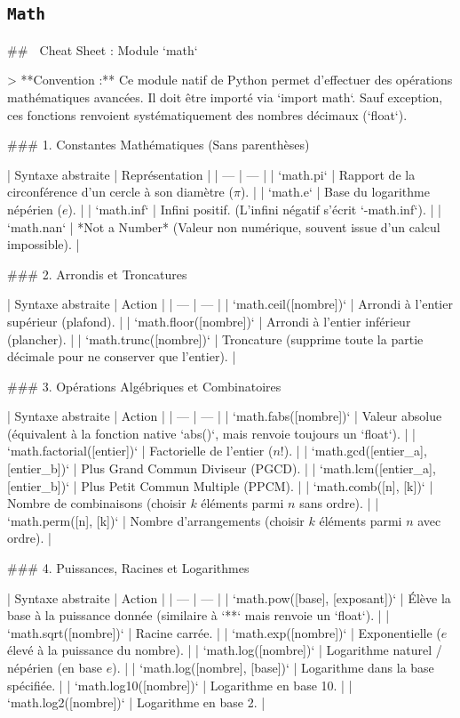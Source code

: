 \subsection{\texttt{Math}}

## 🐍 Cheat Sheet : Module `math`

> **Convention :** Ce module natif de Python permet d'effectuer des opérations mathématiques avancées. Il doit être importé via `import math`. Sauf exception, ces fonctions renvoient systématiquement des nombres décimaux (`float`).

### 1. Constantes Mathématiques (Sans parenthèses)

| Syntaxe abstraite | Représentation |
| --- | --- |
| `math.pi` | Rapport de la circonférence d'un cercle à son diamètre ($\pi$). |
| `math.e` | Base du logarithme népérien ($e$). |
| `math.inf` | Infini positif. (L'infini négatif s'écrit `-math.inf`). |
| `math.nan` | *Not a Number* (Valeur non numérique, souvent issue d'un calcul impossible). |

### 2. Arrondis et Troncatures

| Syntaxe abstraite | Action |
| --- | --- |
| `math.ceil([nombre])` | Arrondi à l'entier supérieur (plafond). |
| `math.floor([nombre])` | Arrondi à l'entier inférieur (plancher). |
| `math.trunc([nombre])` | Troncature (supprime toute la partie décimale pour ne conserver que l'entier). |

### 3. Opérations Algébriques et Combinatoires

| Syntaxe abstraite | Action |
| --- | --- |
| `math.fabs([nombre])` | Valeur absolue (équivalent à la fonction native `abs()`, mais renvoie toujours un `float`). |
| `math.factorial([entier])` | Factorielle de l'entier ($n!$). |
| `math.gcd([entier_a], [entier_b])` | Plus Grand Commun Diviseur (PGCD). |
| `math.lcm([entier_a], [entier_b])` | Plus Petit Commun Multiple (PPCM). |
| `math.comb([n], [k])` | Nombre de combinaisons (choisir $k$ éléments parmi $n$ sans ordre). |
| `math.perm([n], [k])` | Nombre d'arrangements (choisir $k$ éléments parmi $n$ avec ordre). |

### 4. Puissances, Racines et Logarithmes

| Syntaxe abstraite | Action |
| --- | --- |
| `math.pow([base], [exposant])` | Élève la base à la puissance donnée (similaire à `**` mais renvoie un `float`). |
| `math.sqrt([nombre])` | Racine carrée. |
| `math.exp([nombre])` | Exponentielle ($e$ élevé à la puissance du nombre). |
| `math.log([nombre])` | Logarithme naturel / népérien (en base $e$). |
| `math.log([nombre], [base])` | Logarithme dans la base spécifiée. |
| `math.log10([nombre])` | Logarithme en base 10. |
| `math.log2([nombre])` | Logarithme en base 2. |

